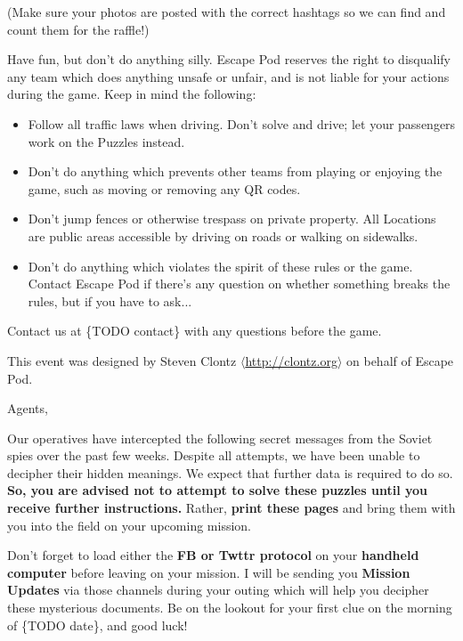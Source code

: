 \documentclass{puzzlehunt}
\begin{document}
(Make sure your photos are posted with the correct hashtags so we can find
and count them for the raffle!)


Have fun, but don't do anything silly. Escape Pod reserves the right to
disqualify any team which does anything unsafe or unfair, and is not liable
for your actions during the game. Keep in mind the following:

\begin{itemize}
  \item Follow all traffic laws when driving. Don't solve and drive; let your
    passengers work on the Puzzles instead.
  \item Don't do anything which prevents other teams from playing or enjoying
    the game, such as moving or removing any QR codes.
  \item Don't jump fences or otherwise trespass on private property. All
    Locations are public areas accessible by driving on roads or walking on
    sidewalks.
  \item Don't do anything which violates the spirit of these rules or the game.
    Contact Escape Pod if there's any question on whether something breaks
    the rules, but if you have to ask...
\end{itemize}


Contact us at \{TODO contact\} with any questions before the game.

\vfill

{\footnotesize This event was designed by Steven Clontz
\(\langle\)\url{http://clontz.org}\(\rangle\) on behalf of Escape Pod.}



\noindent Agents,

Our operatives have intercepted the following secret messages from the
Soviet spies over the past few weeks. Despite all attempts, we have been
unable to decipher their hidden meanings. We expect that further data
is required to do so.
\textbf{So, you are advised not to attempt to solve these puzzles until you
receive further instructions.} Rather, \textbf{print these pages} and
bring them with you into the field on your upcoming mission.

Don't forget to load either the \textbf{FB or Twttr protocol} on your
\textbf{handheld computer} before leaving on your mission. I will be sending
you \textbf{Mission Updates} via those channels during your outing which
will help you decipher these mysterious documents. Be on the lookout for
your first clue on the morning of \{TODO date\}, and good luck!
\end{document}
